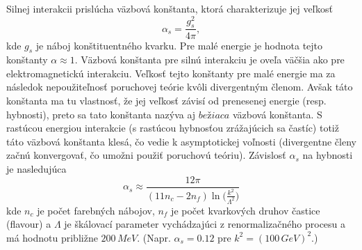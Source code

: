 \documentclass[../../main.tex]{subfiles}
\begin{document}
Silnej interakcii prislúcha väzbová konštanta, ktorá charakterizuje jej veľkosť
$$
\alpha_s= \frac{g_s^2}{4\pi},
$$
kde $g_s$ je náboj konštituentného kvarku. Pre malé energie je hodnota tejto konštanty $\alpha\approx 1$. Väzbová konštanta pre silnú interakciu je oveľa väčšia ako pre elektromagnetickú interakciu. Veľkosť tejto konštanty pre malé energie ma za následok nepoužiteľnosť poruchovej teórie kvôli divergentným členom. Avšak táto konštanta ma tu vlastnosť, že jej veľkosť závisí od prenesenej energie (resp. hybnosti), preto sa tato konštanta nazýva aj $bežiaca$ väzbová konštanta. S rastúcou energiou interakcie (s rastúcou hybnosťou zrážajúcich sa častíc) totiž táto väzbová konštanta klesá, čo vedie k asymptotickej voľnosti (divergentne členy začnú konvergovať, čo umožni použiť poruchovú teóriu). Závislosť $\alpha_s$ na hybnosti je nasledujúca
$$
\alpha_s\approx\frac{12\pi}{(11n_c-2n_f)\ln\big(\frac{k^2}{\Lambda^2}\big)}
$$ 
kde $n_c$ je počet farebných nábojov, $n_f$ je počet kvarkových druhov častice (flavour) a $\Lambda$ je škálovací parameter vychádzajúci z renormalizačného procesu a má hodnotu približne $200\,MeV$. (Napr. $\alpha_s=0.12$ pre $k^2=(100\,GeV)^2$.)
\end{document}
